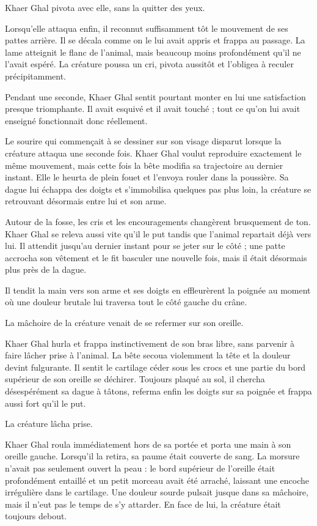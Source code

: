Khaer Ghal pivota avec elle, sans la quitter des yeux.


Lorsqu'elle attaqua enfin, il reconnut suffisamment tôt le mouvement de ses
pattes arrière. Il se décala comme on le lui avait appris et frappa au passage.
La lame atteignit le flanc de l'animal, mais beaucoup moins profondément qu'il
ne l'avait espéré. La créature poussa un cri, pivota aussitôt et l'obligea à
reculer précipitamment.

Pendant une seconde, Khaer Ghal sentit pourtant monter en lui une satisfaction
presque triomphante. Il avait esquivé et il avait touché ; tout ce qu'on lui
avait enseigné fonctionnait donc réellement.

Le sourire qui commençait à se dessiner sur son visage disparut lorsque la
créature attaqua une seconde fois. Khaer Ghal voulut reproduire exactement le
même mouvement, mais cette fois la bête modifia sa trajectoire au dernier
instant. Elle le heurta de plein fouet et l'envoya rouler dans la poussière.
Sa dague lui échappa des doigts et s'immobilisa quelques pas plus loin, la
créature se retrouvant désormais entre lui et son arme.

Autour de la fosse, les cris et les encouragements changèrent brusquement de
ton. Khaer Ghal se releva aussi vite qu'il le put tandis que l'animal repartait
déjà vers lui. Il attendit jusqu'au dernier instant pour se jeter sur le côté ;
une patte accrocha son vêtement et le fit basculer une nouvelle fois, mais il
était désormais plus près de la dague.

Il tendit la main vers son arme et ses doigts en effleurèrent la poignée au
moment où une douleur brutale lui traversa tout le côté gauche du crâne.

La mâchoire de la créature venait de se refermer sur son oreille.

Khaer Ghal hurla et frappa instinctivement de son bras libre, sans parvenir à
faire lâcher prise à l'animal. La bête secoua violemment la tête et la douleur
devint fulgurante. Il sentit le cartilage céder sous les crocs et une partie
du bord supérieur de son oreille se déchirer. Toujours plaqué au sol, il
chercha désespérément sa dague à tâtons, referma enfin les doigts sur sa
poignée et frappa aussi fort qu'il le put.

La créature lâcha prise.

Khaer Ghal roula immédiatement hors de sa portée et porta une main à son
oreille gauche. Lorsqu'il la retira, sa paume était couverte de sang. La
morsure n'avait pas seulement ouvert la peau : le bord supérieur de l'oreille
était profondément entaillé et un petit morceau avait été arraché, laissant
une encoche irrégulière dans le cartilage. Une douleur sourde pulsait jusque
dans sa mâchoire, mais il n'eut pas le temps de s'y attarder. En face de lui,
la créature était toujours debout.

